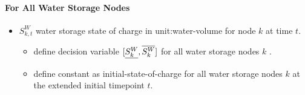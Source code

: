 \paragraph{For All Water Storage Nodes}
\begin{itemize}
\item $S^W_{k,t}$ water storage state of charge in \gls{unit:water-volume} for
  node $k$ at time $t$.

  \begin{itemize}
  \item \gls{define} decision variable $[\underline{S^W_k}, \overline{S^W_k}]$ for all water
    storage nodes $k$ \atallt{}.
  \item \gls{define} constant as initial-state-of-charge for all water storage
    nodes $k$ at the extended initial timepoint $t$.
  \end{itemize}
\end{itemize}
